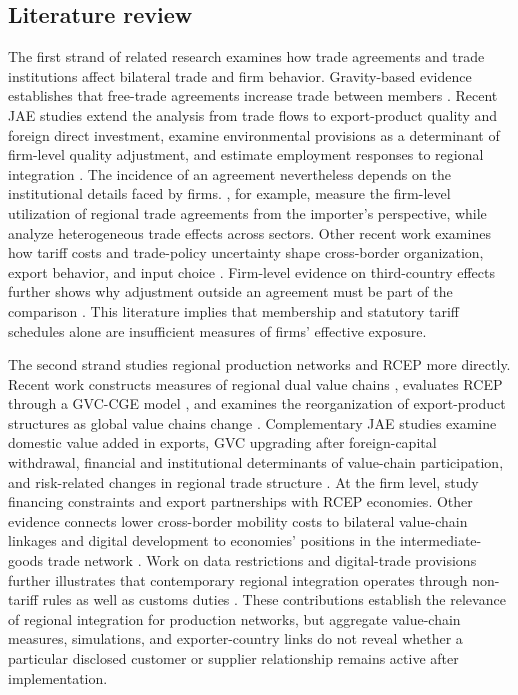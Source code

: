 \documentclass[preprint,12pt,authoryear]{elsarticle}
\begin{document}
\subsection{Literature review}

The first strand of related research examines how trade agreements and trade institutions affect bilateral trade and firm behavior. Gravity-based evidence establishes that free-trade agreements increase trade between members \citep{baier2007free}. Recent JAE studies extend the analysis from trade flows to export-product quality and foreign direct investment, examine environmental provisions as a determinant of firm-level quality adjustment, and estimate employment responses to regional integration \citep{sun2022rtaquality,narayan2022agreements,zhu2025environmental,li2025integration}. The incidence of an agreement nevertheless depends on the institutional details faced by firms. \citet{hayakawa2023firm}, for example, measure the firm-level utilization of regional trade agreements from the importer's perspective, while \citet{ni2022standards} analyze heterogeneous trade effects across sectors. Other recent work examines how tariff costs and trade-policy uncertainty shape cross-border organization, export behavior, and input choice \citep{xie2023tariff,zhou2022trade,handley2024input,poilly2025regional}. Firm-level evidence on third-country effects further shows why adjustment outside an agreement must be part of the comparison \citep{lee2023thirdcountry}. This literature implies that membership and statutory tariff schedules alone are insufficient measures of firms' effective exposure.

The second strand studies regional production networks and RCEP more directly. Recent work constructs measures of regional dual value chains \citep{he2023regional}, evaluates RCEP through a GVC-CGE model \citep{sun2023estimating}, and examines the reorganization of export-product structures as global value chains change \citep{zhang2024restructuring}. Complementary JAE studies examine domestic value added in exports, GVC upgrading after foreign-capital withdrawal, financial and institutional determinants of value-chain participation, and risk-related changes in regional trade structure \citep{du2023higher,wu2023gvc,xu2024financial,ali2026governance,liu2026risks}. At the firm level, \citet{peng2025financing} study financing constraints and export partnerships with RCEP economies. Other evidence connects lower cross-border mobility costs to bilateral value-chain linkages \citep{ma2024mobility} and digital development to economies' positions in the intermediate-goods trade network \citep{huang2026intermediate}. Work on data restrictions and digital-trade provisions further illustrates that contemporary regional integration operates through non-tariff rules as well as customs duties \citep{ma2024data,li2026digitalrules}. These contributions establish the relevance of regional integration for production networks, but aggregate value-chain measures, simulations, and exporter-country links do not reveal whether a particular disclosed customer or supplier relationship remains active after implementation.
\end{document}
